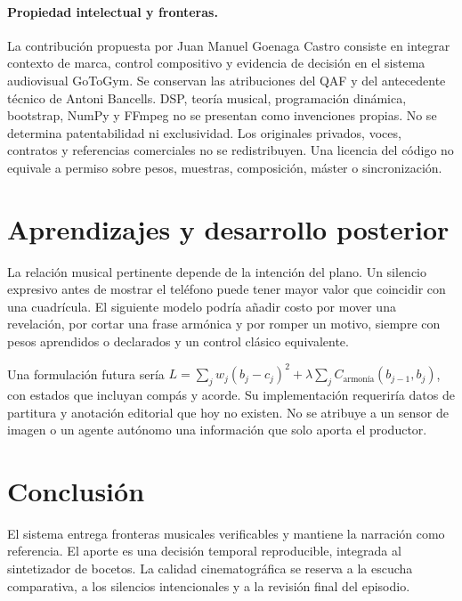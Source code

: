 \documentclass[11pt,a4paper]{article}
\begin{document}
\newpage
\paragraph{Propiedad intelectual y fronteras.}
La contribución propuesta por Juan Manuel Goenaga Castro consiste en integrar contexto de marca, control compositivo y evidencia de decisión en el sistema audiovisual GoToGym. Se conservan las atribuciones del QAF y del antecedente técnico de Antoni Bancells. DSP, teoría musical, programación dinámica, bootstrap, NumPy y FFmpeg no se presentan como invenciones propias. No se determina patentabilidad ni exclusividad. Los originales privados, voces, contratos y referencias comerciales no se redistribuyen. Una licencia del código no equivale a permiso sobre pesos, muestras, composición, máster o sincronización.
\section{Aprendizajes y desarrollo posterior}
La relación musical pertinente depende de la intención del plano. Un silencio expresivo antes de mostrar el teléfono puede tener mayor valor que coincidir con una cuadrícula. El siguiente modelo podría añadir costo por mover una revelación, por cortar una frase armónica y por romper un motivo, siempre con pesos aprendidos o declarados y un control clásico equivalente.

Una formulación futura sería $L=\sum_j w_j(b_j-c_j)^2+\lambda\sum_j C_{\mathrm{armonía}}(b_{j-1},b_j)$, con estados que incluyan compás y acorde. Su implementación requeriría datos de partitura y anotación editorial que hoy no existen. No se atribuye a un sensor de imagen o un agente autónomo una información que solo aporta el productor.
\section{Conclusión}
El sistema entrega fronteras musicales verificables y mantiene la narración como referencia. El aporte es una decisión temporal reproducible, integrada al sintetizador de bocetos. La calidad cinematográfica se reserva a la escucha comparativa, a los silencios intencionales y a la revisión final del episodio.
\end{document}
